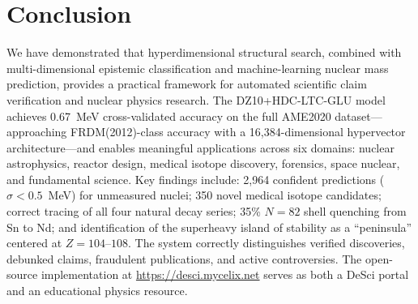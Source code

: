 \documentclass[letterpaper,11pt]{article}
\begin{document}
\section{Conclusion}

We have demonstrated that hyperdimensional structural search, combined with
multi-dimensional epistemic classification and machine-learning nuclear mass
prediction, provides a practical framework for automated scientific claim
verification and nuclear physics research. The DZ10+HDC-LTC-GLU model achieves
0.67~MeV cross-validated accuracy on the full AME2020 dataset---approaching
FRDM(2012)-class accuracy with a 16,384-dimensional hypervector
architecture---and enables meaningful applications across six domains: nuclear
astrophysics, reactor design, medical isotope discovery, forensics, space
nuclear, and fundamental science. Key findings include: 2,964 confident
predictions ($\sigma < 0.5$~MeV) for unmeasured nuclei; 350 novel medical
isotope candidates; correct tracing of all four natural decay series; 35\%
$N = 82$ shell quenching from Sn to Nd; and identification of the superheavy
island of stability as a ``peninsula'' centered at $Z = 104$--$108$.
The system correctly distinguishes verified discoveries, debunked claims,
fraudulent publications, and active controversies. The open-source
implementation at \url{https://desci.mycelix.net} serves as both a DeSci
portal and an educational physics resource.


\end{document}
